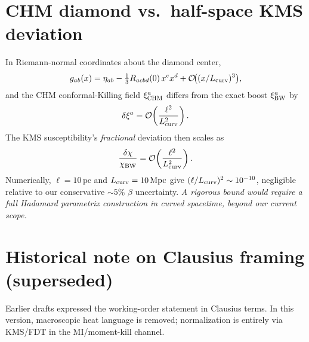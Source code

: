 \documentclass[aps,prd,onecolumn,superscriptaddress,nofootinbib]{revtex4-2}
\begin{document}
\section{CHM diamond vs.\ half-space KMS deviation}
\label{app:chm-kms-estimate}
In Riemann-normal coordinates about the diamond center,
\[
g_{ab}(x)=\eta_{ab}-\tfrac{1}{3}R_{acbd}(0)\,x^c x^d+\mathcal O\!\big((x/L_{\rm curv})^3\big),
\]
and the CHM conformal-Killing field $\xi^a_{\rm CHM}$ differs from the exact boost $\xi^a_{\rm BW}$ by
\[
\delta\xi^a=\mathcal O\!\left(\frac{\ell^2}{L_{\rm curv}^2}\right).
\]
The KMS susceptibility’s \emph{fractional} deviation then scales as
\[
\frac{\delta\chi}{\chi_{\rm BW}}=\mathcal O\!\left(\frac{\ell^2}{L_{\rm curv}^2}\right).
\]
Numerically, $\ell=10\,\mathrm{pc}$ and $L_{\rm curv}=10\,\mathrm{Mpc}$ give $(\ell/L_{\rm curv})^2\sim 10^{-10}$, negligible relative to our conservative $\sim 5\%$ $\beta$ uncertainty. \emph{A rigorous bound would require a full Hadamard parametrix construction in curved spacetime, beyond our current scope.}

\section{Historical note on Clausius framing (superseded)}
\label{app:clausius-historical}
Earlier drafts expressed the working-order statement in Clausius terms. In this version, macroscopic heat language is removed; normalization is entirely via KMS/FDT in the MI/moment-kill channel.
\end{document}
